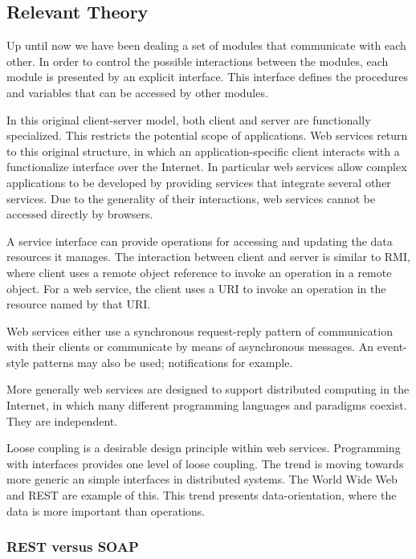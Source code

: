 
\subsection*{Relevant Theory}
Up until now we have been dealing a set of modules that communicate with each other. In order to control the possible interactions between the modules, each module is presented by an explicit interface. This interface defines the procedures and variables that can be accessed by other modules.

In this original client-server model, both client and server are functionally specialized. This restricts the potential scope of applications. Web services return to this original structure, in which an application-specific client interacts with a functionalize interface over the Internet. In particular web services allow complex applications to be developed by providing services that integrate several other services. Due to the generality of their interactions, web services cannot be accessed directly by browsers. 


A service interface can provide operations for accessing and updating the data resources it manages. The interaction between client and server is similar to RMI, where client uses a remote object reference to invoke an operation in a remote object. For a web service, the client uses a URI to invoke an operation in the resource named by that URI. 

Web services either use a synchronous request-reply pattern of communication with their clients or communicate by means of asynchronous messages. An event-style patterns may also be used; notifications for example. 

More generally web services are designed to support distributed computing in the Internet, in which many different programming languages and paradigms coexist. They are independent. 

Loose coupling is a desirable design principle within web services. Programming with interfaces provides one level of loose coupling. 
The trend is moving towards more generic an simple interfaces in distributed systems. The World Wide Web and REST are example of this. This trend presents data-orientation, where the data is more important than operations. 


\subsubsection*{REST versus SOAP}

